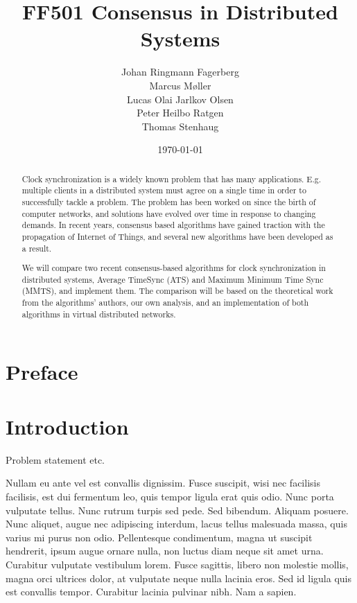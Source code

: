 \documentclass[a4paper,12pt]{article}
\date{\today}
\title{FF501 Consensus in Distributed Systems}
\author{
  Johan Ringmann Fagerberg \\
  Marcus Møller \\
  Lucas Olai Jarlkov Olsen \\
  Peter Heilbo Ratgen \\
  Thomas Stenhaug
}
\begin{document}
\maketitle

\setlength{\baselineskip}{1.44\baselineskip}

\begin{abstract}

Clock synchronization is a widely known problem that has many applications. E.g. multiple clients in a distributed system must agree on a single time in order to successfully tackle a problem. The problem has been worked on since the birth of computer networks, and solutions have evolved over time in response to changing demands. In recent years, consensus based algorithms have gained traction with the propagation of Internet of Things, and several new algorithms have been developed as a result.

We will compare two recent consensus-based algorithms for clock synchronization in distributed systems, Average TimeSync (ATS) and Maximum Minimum Time Sync (MMTS), and implement them. The comparison will be based on the theoretical work from the algorithms' authors, our own analysis, and an implementation of both algorithms in virtual distributed networks.
\end{abstract}

\clearpage
\tableofcontents
\clearpage

\setcounter{page}{1}

\section{Preface}

\section{Introduction}

Problem statement etc.

Nullam eu ante vel est convallis dignissim.  Fusce suscipit, wisi nec
facilisis facilisis, est dui fermentum leo, quis tempor ligula erat
quis odio.  Nunc porta vulputate tellus.  Nunc rutrum turpis sed pede.
Sed bibendum.  Aliquam posuere.  Nunc aliquet, augue nec adipiscing
interdum, lacus tellus malesuada massa, quis varius mi purus non odio.
Pellentesque condimentum, magna ut suscipit hendrerit, ipsum augue
ornare nulla, non luctus diam neque sit amet urna.  Curabitur
vulputate vestibulum lorem.  Fusce sagittis, libero non molestie
mollis, magna orci ultrices dolor, at vulputate neque nulla lacinia
eros.  Sed id ligula quis est convallis tempor.  Curabitur lacinia
pulvinar nibh.  Nam a sapien.
\end{document}
